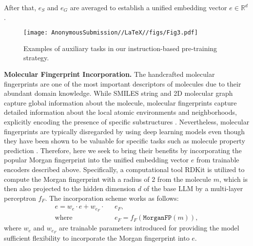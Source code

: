 \noindent
After that, $e_S$ and $e_G$ are averaged to establish a unified embedding vector $e \in \mathbb{R}^d$. 

\begin{figure}[!ht]
    \centering
    \texttt{[image: AnonymousSubmission//LaTeX//figs/Fig3.pdf]}
    \caption{Examples of auxiliary tasks in our instruction-based pre-training strategy.}
    \label{Fig3}
\end{figure}

\noindent
\textbf{Molecular Fingerprint Incorporation.} The handcrafted molecular fingerprints are one of the most important descriptors of molecules due to their abundant domain knowledge. While SMILES string and 2D molecular graph capture global information about the molecule, molecular fingerprints capture detailed information about the local atomic environments and neighborhoods, explicitly encoding the presence of specific substructures \cite{doi2022screening}. Nevertheless, molecular fingerprints are typically disregarded by using deep learning models even though they have been shown to be valuable for specific tasks such as molecule property prediction \cite{xia2024understanding}. Therefore, here we seek to bring their benefits by incorporating the popular Morgan fingerprint \cite{morgan1965generation} into the unified embedding vector $e$ from trainable encoders described above. Specifically, a computational tool RDKit \cite{landrum2013rdkit} is utilized to compute the Morgan fingerprint with a radius of 2 from the molecule $m$, which is then also projected to the hidden dimension $d$ of the base LLM by a multi-layer perceptron $f_F$. The incorporation scheme works as follows: 
\begin{equation}
\begin{aligned}
e = w_e \cdot e + w_{e_F} \cdot \text{ }& e_F, \\
\text{where }& e_F = f_F(\texttt{MorganFP}(m)), 
\end{aligned}
\end{equation}
where $w_e$ and $w_{e_F}$ are trainable parameters introduced for providing the model sufficient flexibility to incorporate the Morgan fingerprint into $e$. 

